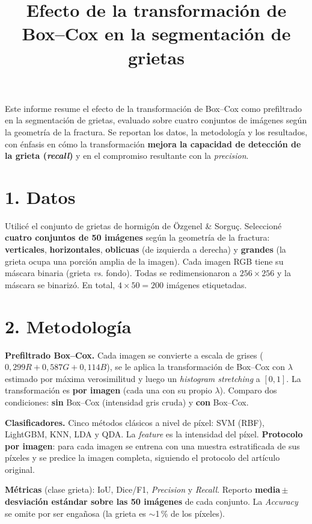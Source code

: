 \documentclass[11pt]{article}
\title{\vspace{-2.5em}Efecto de la transformaci\'on de Box--Cox en la segmentaci\'on de grietas}
\author{}
\date{}
\begin{document}
\maketitle
\vspace{-3em}

Este informe resume el efecto de la transformaci\'on de Box--Cox como prefiltrado en la
segmentaci\'on de grietas, evaluado sobre cuatro conjuntos de im\'agenes seg\'un la geometr\'ia
de la fractura. Se reportan los datos, la metodolog\'ia y los resultados, con \'enfasis en
c\'omo la transformaci\'on \textbf{mejora la capacidad de detecci\'on de la grieta
(\emph{recall})} y en el compromiso resultante con la \emph{precision}.

\section*{1. Datos}
Utilic\'e el conjunto de grietas de hormig\'on de \"Ozgenel \& Sorgu\c{c}. Seleccion\'e
\textbf{cuatro conjuntos de 50 im\'agenes} seg\'un la geometr\'ia de la fractura:
\textbf{verticales}, \textbf{horizontales}, \textbf{oblicuas} (de izquierda a derecha) y
\textbf{grandes} (la grieta ocupa una porci\'on amplia de la imagen). Cada imagen RGB tiene su
m\'ascara binaria (grieta \emph{vs.} fondo). Todas se redimensionaron a $256\times256$ y la
m\'ascara se binariz\'o. En total, $4\times50=200$ im\'agenes etiquetadas.

\section*{2. Metodolog\'ia}
\textbf{Prefiltrado Box--Cox.} Cada imagen se convierte a escala de grises
($0{,}299R+0{,}587G+0{,}114B$), se le aplica la transformaci\'on de Box--Cox con $\lambda$
estimado por m\'axima verosimilitud y luego un \emph{histogram stretching} a $[0,1]$. La
transformaci\'on es \textbf{por imagen} (cada una con su propio $\lambda$). Comparo dos
condiciones: \textbf{sin} Box--Cox (intensidad gris cruda) y \textbf{con} Box--Cox.

\textbf{Clasificadores.} Cinco m\'etodos cl\'asicos a nivel de p\'ixel: SVM (RBF), LightGBM,
KNN, LDA y QDA. La \emph{feature} es la intensidad del p\'ixel. \textbf{Protocolo por imagen}:
para cada imagen se entrena con una muestra estratificada de sus p\'ixeles y se predice la
imagen completa, siguiendo el protocolo del art\'iculo original.

\textbf{M\'etricas} (clase grieta): IoU, Dice/F1, \emph{Precision} y \emph{Recall}. Reporto
\textbf{media\,$\pm$\,desviaci\'on est\'andar sobre las 50 im\'agenes} de cada conjunto.
La \emph{Accuracy} se omite por ser enga\~nosa (la grieta es $\sim$1\,\% de los p\'ixeles).
\end{document}
